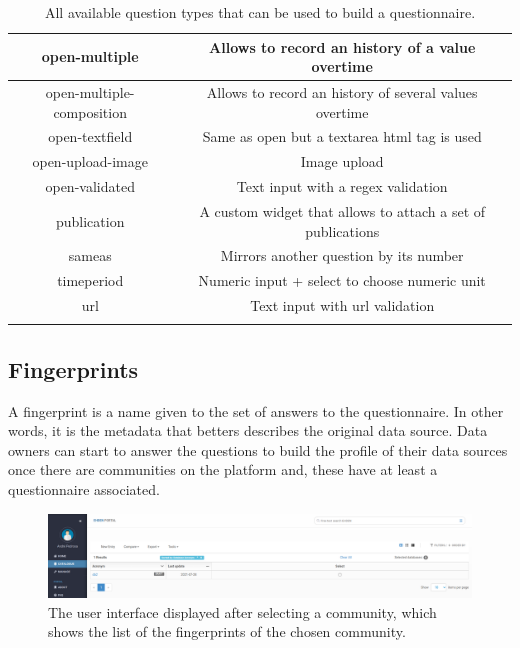 \begin{longtable}[c]{|c|c|}
open-multiple                     & Allows to record an history of a value overtime             \\ \hline
open-multiple-composition         & Allows to record an history of several values overtime      \\ \hline
open-textfield                    & Same as open but a textarea html tag is used                \\ \hline
open-upload-image                 & Image upload                                                \\ \hline
open-validated                    & Text input with a regex validation                          \\ \hline
publication                       & A custom widget that allows to attach a set of publications \\ \hline
sameas                            & Mirrors another question by its number                      \\ \hline
timeperiod                        & Numeric input + select to choose numeric unit               \\ \hline
url                               & Text input with url validation                              \\ \hline
\caption{All available question types that can be used to build a questionnaire.}
\label{tab:original-question-types}\\
\end{longtable}

\subsection{Fingerprints}
\label{sec:fingerprints}

A fingerprint is a name given to the set of answers to the questionnaire.
In other words, it is the metadata that betters describes the original data source.
Data owners can start to answer the questions to build the profile of their data sources once there are communities on the platform and, these have at least a questionnaire associated.

\begin{figure}[H]
    \center
    \includegraphics[width=\textwidth]{listings}
    \caption{The user interface displayed after selecting a community, which shows the list of the fingerprints of the chosen community.}
    \label{fig:listings}
\end{figure}

